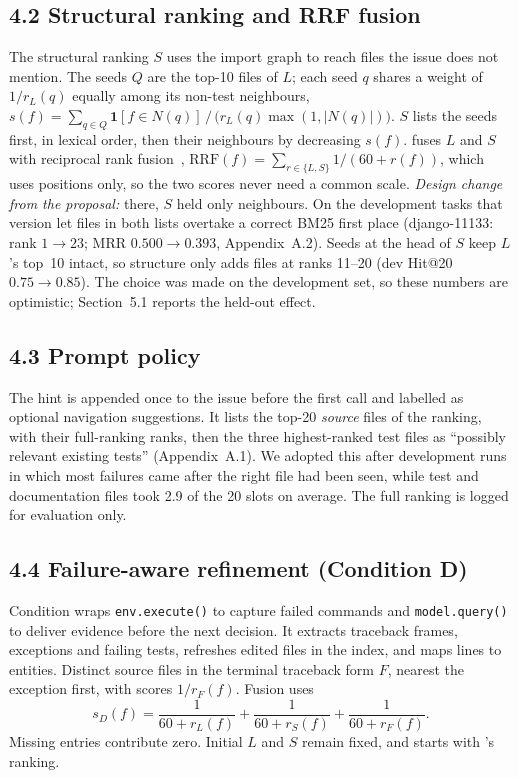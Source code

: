 \subsection*{4.2 Structural ranking and RRF fusion}
The structural ranking $S$ uses the import graph to reach files the issue does not mention. The
seeds $Q$ are the top-10 files of $L$; each seed $q$ shares a weight of $1/r_L(q)$ equally among its
non-test neighbours, $s(f)=\sum_{q\in Q}\mathbf{1}[f\in N(q)]\,/\,\bigl(r_L(q)\max(1,|N(q)|)\bigr)$.
$S$ lists the seeds first, in lexical order, then their neighbours by decreasing $s(f)$.
\condC{} fuses $L$ and $S$ with reciprocal rank fusion~\cite{cormack2009rrf},
$\mathrm{RRF}(f)=\sum_{r\in\{L,S\}}1/(60+r(f))$, which uses positions only, so the two scores never
need a common scale.
\emph{Design change from the proposal:} there, $S$ held only neighbours. On the development tasks
that version let files in both lists overtake a correct BM25 first place (django-11133: rank
$1\to23$; MRR $0.500\to0.393$, Appendix~A.2). Seeds at the head of $S$ keep $L$'s top~10 intact, so
structure only adds files at ranks 11--20 (dev Hit@20 $0.75\to0.85$). The choice was made on the
development set, so these numbers are optimistic; Section~5.1 reports the held-out effect.

\subsection*{4.3 Prompt policy}
The hint is appended once to the issue before the first call and labelled as optional navigation
suggestions. It lists the top-20 \emph{source} files of the ranking, with their full-ranking ranks,
then the three highest-ranked test files as ``possibly relevant existing tests'' (Appendix~A.1).
We adopted this after development runs in which most failures came after the right file had been
seen, while test and documentation files took 2.9 of the 20 slots on average. The full ranking is
logged for evaluation only.

\subsection*{4.4 Failure-aware refinement (Condition D)}
Condition \condD{} wraps \texttt{env.execute()} to capture failed commands and
\texttt{model.query()} to deliver evidence before the next decision. It extracts traceback
frames, exceptions and failing tests, refreshes edited files in the index, and maps lines
to entities. Distinct source files in the terminal traceback form $F$, nearest the exception
first, with scores $1/r_F(f)$. Fusion uses
\[
 s_D(f)=\frac{1}{60+r_L(f)}
       +\frac{1}{60+r_S(f)}
       +\frac{1}{60+r_F(f)}.
\]
Missing entries contribute zero.
Initial $L$ and $S$ remain fixed, and \condD{} starts with \condC{}'s ranking.

